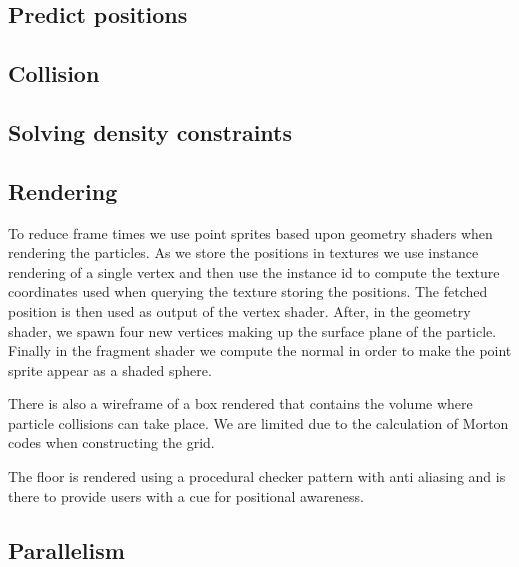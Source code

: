 

\subsection{Predict positions}


\subsection{Collision}


\subsection{Solving density constraints}


\subsection{Rendering} To reduce frame times we use point sprites based upon
geometry shaders when rendering the particles. As we store the positions in
textures we use instance rendering of a single vertex and then use the instance
id to compute the texture coordinates used when querying the texture storing
the positions. The fetched position is then used as output of the vertex
shader. After, in the geometry shader, we spawn four new vertices making up the
surface plane of the particle. Finally in the fragment shader we compute the
normal in order to make the point sprite appear as a shaded sphere.

There is also a wireframe of a box rendered that contains the volume where
particle collisions can take place. We are limited due to the calculation of
Morton codes when constructing the grid.

The floor is rendered using a procedural checker pattern with anti aliasing and
is there to provide users with a cue for positional awareness.


\subsection{Parallelism}

